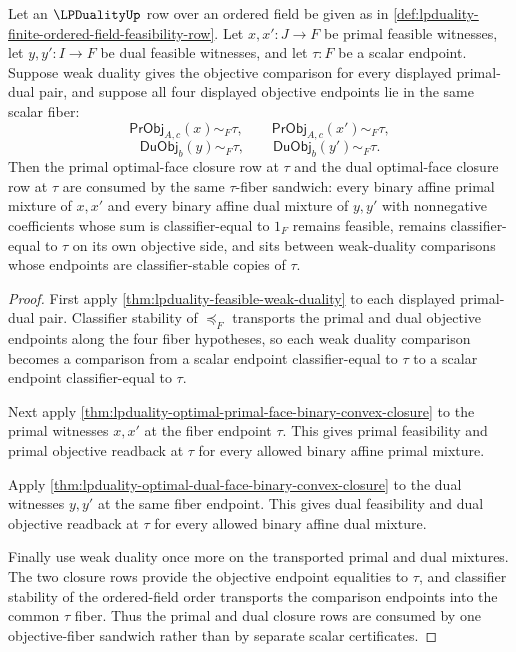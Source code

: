 \begin{theorem}
\label{thm:lpduality-objective-fiber-sandwich-closure}
Let an $\LPDualityUp$ row over an ordered field be given as in
\autoref{def:lpduality-finite-ordered-field-feasibility-row}. Let
$x,x':J\to F$ be primal feasible witnesses, let $y,y':I\to F$ be dual feasible
witnesses, and let $\tau:F$ be a scalar endpoint. Suppose weak duality gives
the objective comparison for every displayed primal-dual pair, and suppose all
four displayed objective endpoints lie in the same scalar fiber:
$$
\mathsf{PrObj}_{A,c}(x)\sim_F\tau,
\qquad
\mathsf{PrObj}_{A,c}(x')\sim_F\tau,
$$
$$
\mathsf{DuObj}_{b}(y)\sim_F\tau,
\qquad
\mathsf{DuObj}_{b}(y')\sim_F\tau.
$$
Then the primal optimal-face closure row at $\tau$ and the dual optimal-face
closure row at $\tau$ are consumed by the same $\tau$-fiber sandwich: every
binary affine primal mixture of $x,x'$ and every binary affine dual mixture of
$y,y'$ with nonnegative coefficients whose sum is classifier-equal to $1_F$
remains feasible, remains classifier-equal to $\tau$ on its own objective
side, and sits between weak-duality comparisons whose endpoints are
classifier-stable copies of $\tau$.
\end{theorem}
\begin{proof}
First apply \autoref{thm:lpduality-feasible-weak-duality} to each displayed
primal-dual pair. Classifier stability of $\preceq_F$ transports the primal
and dual objective endpoints along the four fiber hypotheses, so each weak
duality comparison becomes a comparison from a scalar endpoint
classifier-equal to $\tau$ to a scalar endpoint classifier-equal to $\tau$.

Next apply
\autoref{thm:lpduality-optimal-primal-face-binary-convex-closure} to the
primal witnesses $x,x'$ at the fiber endpoint $\tau$. This gives primal
feasibility and primal objective readback at $\tau$ for every allowed binary
affine primal mixture.

Apply
\autoref{thm:lpduality-optimal-dual-face-binary-convex-closure} to the dual
witnesses $y,y'$ at the same fiber endpoint. This gives dual feasibility and
dual objective readback at $\tau$ for every allowed binary affine dual mixture.

Finally use weak duality once more on the transported primal and dual mixtures.
The two closure rows provide the objective endpoint equalities to $\tau$, and
classifier stability of the ordered-field order transports the comparison
endpoints into the common $\tau$ fiber. Thus the primal and dual closure rows
are consumed by one objective-fiber sandwich rather than by separate scalar
certificates.
\end{proof}


